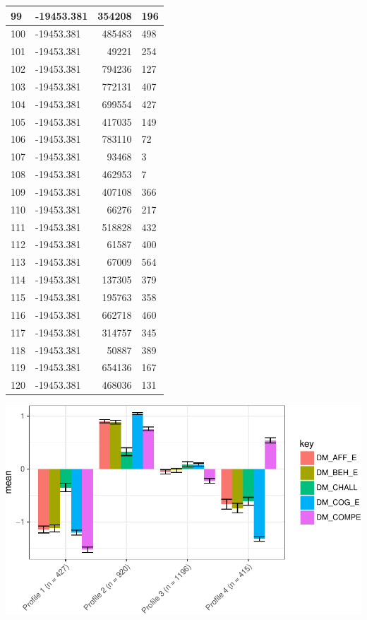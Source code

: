 \documentclass[]{book}
\theoremstyle{definition}
\theoremstyle{definition}
\theoremstyle{definition}
\theoremstyle{remark}
\begin{document}
\begin{tabular}{l|l|r|l}
\hline
99 & -19453.381 & 354208 & 196\\
\hline
100 & -19453.381 & 485483 & 498\\
\hline
101 & -19453.381 & 49221 & 254\\
\hline
102 & -19453.381 & 794236 & 127\\
\hline
103 & -19453.381 & 772131 & 407\\
\hline
104 & -19453.381 & 699554 & 427\\
\hline
105 & -19453.381 & 417035 & 149\\
\hline
106 & -19453.381 & 783110 & 72\\
\hline
107 & -19453.381 & 93468 & 3\\
\hline
108 & -19453.381 & 462953 & 7\\
\hline
109 & -19453.381 & 407108 & 366\\
\hline
110 & -19453.381 & 66276 & 217\\
\hline
111 & -19453.381 & 518828 & 432\\
\hline
112 & -19453.381 & 61587 & 400\\
\hline
113 & -19453.381 & 67009 & 564\\
\hline
114 & -19453.381 & 137305 & 379\\
\hline
115 & -19453.381 & 195763 & 358\\
\hline
116 & -19453.381 & 662718 & 460\\
\hline
117 & -19453.381 & 314757 & 345\\
\hline
118 & -19453.381 & 50887 & 389\\
\hline
119 & -19453.381 & 654136 & 167\\
\hline
120 & -19453.381 & 468036 & 131\\
\hline
\end{tabular}

\begin{center}\includegraphics[width=0.8\linewidth]{rosenberg-dissertation_files/figure-latex/spec-solutions-m1_4-1} \end{center}
\end{document}
